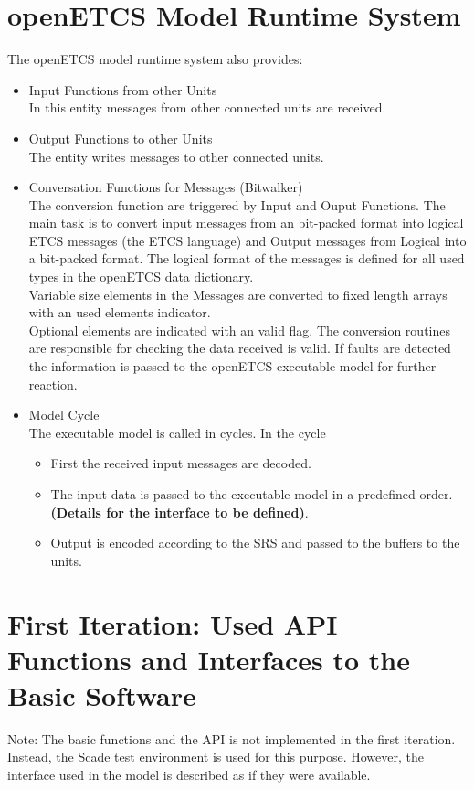 \documentclass{template/openetcs_report}
\begin{document}
\section{openETCS Model Runtime System}
The openETCS model runtime system also provides:

\begin{itemize}
\item Input Functions from other Units\\
In this entity messages from other connected units are received.
\item Output Functions to other Units\\
The entity writes messages to other connected units.
\item Conversation Functions for Messages (Bitwalker)\\
The conversion function are triggered by Input and Ouput Functions. The main task is to convert input messages from an bit-packed format into logical ETCS messages (the ETCS language) and Output messages from Logical into a bit-packed format. The logical format of the messages is defined for all used types in the openETCS data dictionary. \\
Variable size elements in the Messages are converted to fixed length arrays with an used elements indicator.\\
Optional elements are indicated with an valid flag.
The conversion routines are responsible for checking the data received is valid. If  faults are detected the information is passed to the openETCS executable model for further reaction. 
\item Model Cycle\\
The executable model is called in cycles. In the cycle 
\begin{itemize}
\item First the received input messages are decoded.
\item The input data is passed to the executable model in a predefined order. \textbf{(Details for the interface to be defined)}.
\item Output is encoded according to the SRS and passed to the  buffers to the units.
\end{itemize}

\end{itemize}




\section{First Iteration: Used API Functions and Interfaces to the Basic Software}
Note: The basic functions and the API is not implemented in the first iteration. Instead, the Scade test environment is used for this purpose. However, the interface used in the model is described as if they were available.
\end{document}
